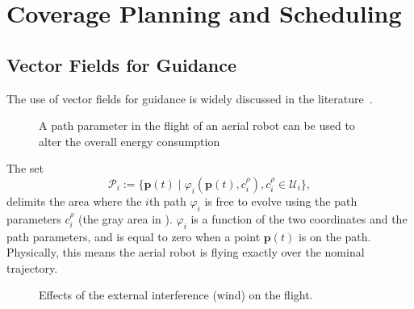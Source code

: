 
\chapter{\color{cyan}Coverage Planning and Scheduling}
\label{cp:dyn}




\section{\color{red}Vector Fields for Guidance}

The use of vector fields for guidance is widely discussed in the literature~\citep{lindemann2005smoothly,gonccalves2010vector,panagou2014motion,zhou2014vector,kapitanyuk2017guiding,de2017guidance}.

\begin{figure}[h]
  \centering
  
  \caption[Path parameter in the flight of an aerial robot]{A path parameter in the flight of an aerial robot can be used to alter the overall energy consumption}
  \label{fig:tee1}
\end{figure}
%  

The set
\begin{equation}\label{eq:area}
  \mathcal{P}_i:=\{\mathbf{p}(t)\mid\varphi_i(\mathbf{p}(t),c_{i}^\rho),c_i^\rho\in\mathcal{U}_i\},
\end{equation}
delimits the area where the $i$th path $\varphi_i$ is free to evolve using the path parameters $c_i^\rho$ (the gray area in ). $\varphi_i$ is a function of the two coordinates and the path parameters, and is equal to zero when a point $\mathbf{p}(t)$ is on the path. Physically, this means the aerial robot is flying exactly over the nominal trajectory. 

\begin{figure}[h]
  \centering
  
  \caption[External interference on the path]{Effects of the external interference (wind) on the flight.}
  \label{fig:tee3}
\end{figure}

